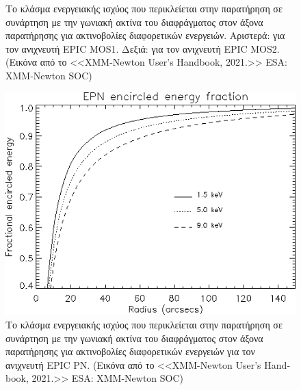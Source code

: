 \begin{figure}%
    \centering
    \qquad
     \caption{Το κλάσμα ενεργειακής ισχύος που περικλείεται στην παρατήρηση σε συνάρτηση με την γωνιακή ακτίνα του διαφράγματος στον άξονα παρατήρησης για ακτινοβολίες διαφορετικών ενεργειών. Αριστερά: για τον ανιχνευτή \textlatin{EPIC MOS1}. Δεξιά: για τον ανιχνευτή \textlatin{EPIC MOS2}. (Εικόνα από το <<\textlatin{XMM-Newton User's Handbook, 2021.}>> \textlatin{ESA: XMM-Newton SOC})} \label{fig:EEF_MOS}
\end{figure}
\begin{figure}
 \begin{center}
 \includegraphics[width=0.7\linewidth]{Figures/EFF_PN.png}
 \caption{Το κλάσμα ενεργειακής ισχύος που περικλείεται στην παρατήρηση σε συνάρτηση με την γωνιακή ακτίνα του διαφράγματος στον άξονα παρατήρησης για ακτινοβολίες διαφορετικών ενεργειών για τον ανιχνευτή \textlatin{EPIC} ΡΝ. (Εικόνα από το <<\textlatin{XMM-Newton User's Handbook, 2021.}>> \textlatin{ESA: XMM-Newton SOC})}
 \label{fig:EEF_PN}
 \end{center}
 \end{figure}
